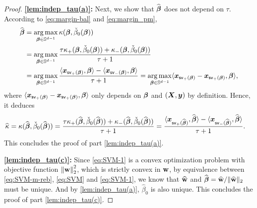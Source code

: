 \begin{proof}
	\vspace{0.5\baselineskip}
	\noindent
	\textbf{\ref{lem:indep_tau(a)}:}
	Next, we show that $\hat\vbeta$ does not depend on $\tau$. According to \cref{eq:margin-bal} and \cref{eq:margin_pm},
		\begin{align*}
			\hat\vbeta & = \argmax_{\vbeta \in \S^{d-1}} \kappa(\vbeta, \check\beta_0(\vbeta))  \\
		& =
		\argmax_{\vbeta \in \S^{d-1}} \frac{\tau \kappa_{+}(\vbeta, \check\beta_0(\vbeta)) +
		\kappa_{-}(\vbeta, \check\beta_0(\vbeta))}{\tau + 1} \\
		& = 
		\argmax_{\vbeta \in \S^{d-1}} \frac{\< \xx_{\mathsf{sv}_+(\vbeta)}, 
		\vbeta \> - \< \xx_{\mathsf{sv}_-(\vbeta)}, \vbeta \>}{\tau+1}
		= \argmax_{\vbeta \in \S^{d-1}} \< \xx_{\mathsf{sv}_+(\vbeta)} - \xx_{\mathsf{sv}_+(\vbeta)}, \vbeta \>,
		\end{align*}
	where $\< \xx_{\mathsf{sv}_+(\vbeta)} - \xx_{\mathsf{sv}_+(\vbeta)}, \vbeta \>$ only depends on $\vbeta$ and $(\XX, \yy)$ by definition. Hence, it deduces
	\begin{equation*}
		\begin{aligned}
			\hat\kappa & = \kappa(\hat\vbeta, \check\beta_0(\hat\vbeta)) 
		=
		\frac{\tau \kappa_{+}(\hat\vbeta, \check\beta_0(\hat\vbeta)) +
		\kappa_{-}(\hat\vbeta, \check\beta_0(\hat\vbeta))}{\tau + 1}
		=
		\frac{\< \xx_{\mathsf{sv}_+(\hat\vbeta)}, 
		\hat\vbeta \> - \< \xx_{\mathsf{sv}_-(\hat\vbeta)}, \hat\vbeta \>}{\tau+1}.
		\end{aligned}
	\end{equation*}
        This concludes the proof of part \ref{lem:indep_tau(a)}.

	\vspace{0.5\baselineskip}
	\noindent
	\textbf{\ref{lem:indep_tau(c)}:}
	Since \cref{eq:SVM-1} is a convex optimization problem with objective function $\norm{\bw}_2^2$, which is strictly convex in $\bw$, by equivalence between \cref{eq:SVM-m-reb}, \eqref{eq:SVM} and \eqref{eq:SVM-1}, we know that $\hat\bw$ and $\hat\vbeta = \hat\bw/\|\hat\bw\|_2$ must be unique. And by \ref{lem:indep_tau(a)}, $\hat\beta_0$ is also unique. This concludes the proof of part \ref{lem:indep_tau(c)}.
\end{proof}

